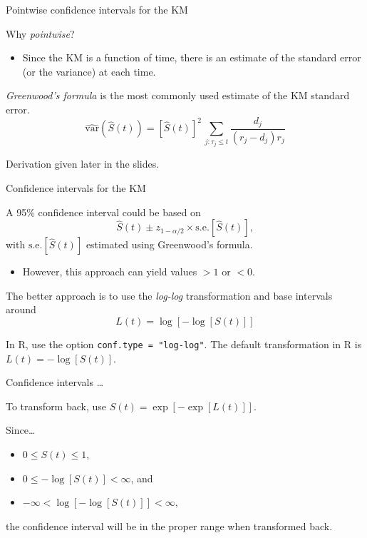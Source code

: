 \documentclass[ignorenonframetext,]{beamer}
\providecommand{\tightlist}{%
  \setlength{\itemsep}{0pt}\setlength{\parskip}{0pt}}
\begin{document}
\begin{frame}{%
\protect\hypertarget{pointwise-confidence-intervals-for-the-km}{%
Pointwise confidence intervals for the KM}}

Why \emph{pointwise}?

\begin{itemize}
\tightlist
\item
  Since the KM is a function of time, there is an estimate of the
  standard error (or the variance) at each time.
\end{itemize}

\emph{Greenwood’s formula} is the most commonly used estimate of the KM
standard error. \[
\widehat{\text{var}} (\widehat{S}(t)) =
[\widehat{S}(t)]^2 \, \sum_{j: \tau_j \leq t} \frac{d_j}{(r_j-d_j) r_j}
\]

Derivation given later in the slides.

\end{frame}

\begin{frame}{%
\protect\hypertarget{confidence-intervals-for-the-km}{%
Confidence intervals for the KM}}

A 95\% confidence interval could be based on \[  
\widehat{S}(t)  \pm z_{1-\alpha/2} \times \text{s.e.}[\widehat{S}(t)], 
\] with \(\text{s.e.}[\widehat{S}(t)]\) estimated using Greenwood’s
formula.

\begin{itemize}
\tightlist
\item
  However, this approach can yield values \(>1\) or \(<0\).
\end{itemize}

The better approach is to use the \emph{log-log} transformation and base
intervals around \[
L(t) = \log[-\log[S(t)]]
\]

\vspace{1cm}

\footnotesize

In \textsf{R}, use the option \texttt{conf.type = "log-log"}. The
default transformation in \textsf{R} is \(L(t) = -\log[S(t)]\).

\end{frame}

\begin{frame}{%
\protect\hypertarget{confidence-intervals}{%
Confidence intervals \ldots  }}

To transform back, use \(S(t)=\exp[-\exp[L(t)]]\).

\vspace{1cm}

Since\ldots{}

\begin{itemize}
\item
  \(0 \leq S(t) \le 1\),
\item
  \(0 \leq -\log[S(t)] < \infty\), and
\item
  \(-\infty < \log[-\log[S(t)]] < \infty,\)
\end{itemize}

the confidence interval will be in the proper range when transformed
back.

\end{frame}
\end{document}
